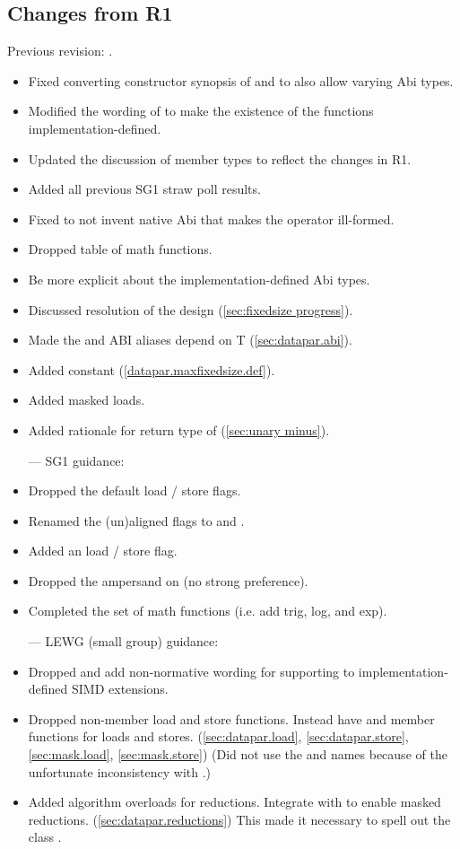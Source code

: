 \subsection{Changes from R1}
Previous revision: \parencite{P0214R1}.
\begin{itemize}
    \item Fixed converting constructor synopsis of \datapar and \mask to also allow varying Abi types.
    \item Modified the wording of  to make the existence of the functions implementation-defined.
    \item Updated the discussion of member types to reflect the changes in R1.
    \item Added all previous SG1 straw poll results.
    \item Fixed  to not invent native Abi that makes the operator ill-formed.
    \item Dropped table of math functions.
    \item Be more explicit about the implementation-defined Abi types.
    \item Discussed resolution of the \fixedsizeN design (\ref{sec:fixedsize progress}).
    \item Made the  and  ABI aliases depend on \type T (\ref{sec:datapar.abi}).
    \item Added  constant (\ref{datapar.maxfixedsize.def}).
    \item Added masked loads.
    \item Added rationale for return type of \datapar[::operator-()] (\ref{sec:unary minus}).
  \color{black}\item[---] SG1 guidance:
    \item Dropped the default load / store flags.
    \item Renamed the (un)aligned flags to  and .
    \item Added an  load / store flag.
    \item Dropped the ampersand on  (no strong preference).
    \item Completed the set of math functions (i.e. add trig, log, and exp).
  \color{black}\item[---] LEWG (small group) guidance:
    \item Dropped  and add non-normative wording for supporting  to implementation-defined SIMD extensions.
    \item Dropped non-member load and store functions.
    Instead have  and  member functions for loads and stores. (\ref{sec:datapar.load}, \ref{sec:datapar.store}, \ref{sec:mask.load}, \ref{sec:mask.store})
    (Did not use the  and  names because of the unfortunate inconsistency with \std{}.)
    \item Added algorithm overloads for \datapar reductions.
    Integrate with  to enable masked reductions. (\ref{sec:datapar.reductions})
    This made it necessary to spell out the class .
\end{itemize}
